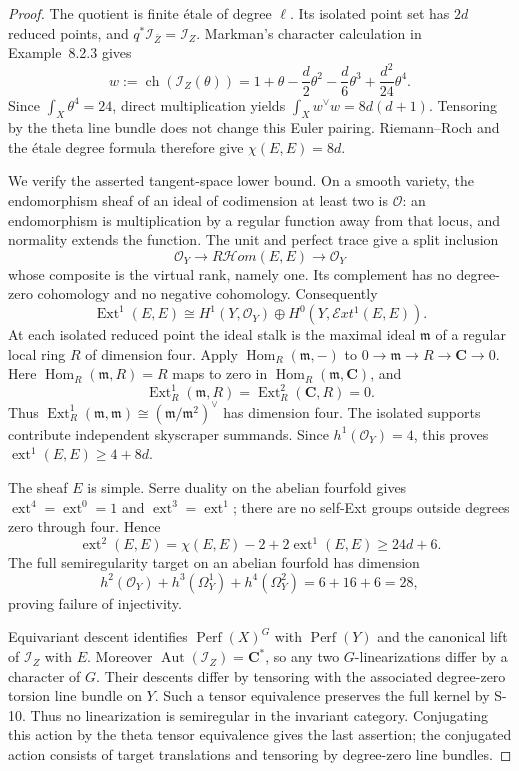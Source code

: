 \begin{proof}
The quotient is finite \'etale of degree $\ell$. Its isolated
point set has $2d$ reduced points, and
$q^*\mathcal I_{\bar Z}=\mathcal I_Z$.
Markman's character calculation in Example~8.2.3 gives
\[
 w:=\operatorname{ch}(\mathcal I_Z(\theta))
   =1+\theta-\frac d2\theta^2-\frac d6\theta^3
          +\frac{d^2}{24}\theta^4 .
\]
Since $\int_X\theta^4=24$, direct multiplication yields
$\int_X w^\vee w=8d(d+1)$. Tensoring by the theta line bundle
does not change this Euler pairing. Riemann--Roch and the
\'etale degree formula therefore give $\chi(E,E)=8d$.

We verify the asserted tangent-space lower bound. On a smooth
variety, the endomorphism sheaf of an ideal of codimension at
least two is $\mathcal O$: an endomorphism is multiplication
by a regular function away from that locus, and normality
extends the function. The unit and perfect trace give a split
inclusion
\[
 \mathcal O_Y\longrightarrow R\mathcal Hom(E,E)
       \longrightarrow\mathcal O_Y
\]
whose composite is the virtual rank, namely one. Its complement
has no degree-zero cohomology and no negative cohomology.
Consequently
\[
 \operatorname{Ext}^1(E,E)
 \cong H^1(Y,\mathcal O_Y)
       \oplus H^0(Y,\mathcal Ext^1(E,E)).
\]
At each isolated reduced point the ideal stalk is the maximal
ideal $\mathfrak m$ of a regular local ring $R$ of dimension
four. Apply $\operatorname{Hom}_R(\mathfrak m,-)$ to
$0\to\mathfrak m\to R\to\mathbf C\to0$.
Here $\operatorname{Hom}_R(\mathfrak m,R)=R$ maps to zero in
$\operatorname{Hom}_R(\mathfrak m,\mathbf C)$, and
\[
 \operatorname{Ext}^1_R(\mathfrak m,R)
   =\operatorname{Ext}^2_R(\mathbf C,R)=0.
\]
Thus
$\operatorname{Ext}^1_R(\mathfrak m,\mathfrak m)
\cong(\mathfrak m/\mathfrak m^2)^\vee$ has dimension four.
The isolated supports contribute independent skyscraper
summands. Since $h^1(\mathcal O_Y)=4$, this proves
$\operatorname{ext}^1(E,E)\ge4+8d$.

The sheaf $E$ is simple. Serre duality on the abelian fourfold
gives $\operatorname{ext}^4=\operatorname{ext}^0=1$ and
$\operatorname{ext}^3=\operatorname{ext}^1$; there are no
self-Ext groups outside degrees zero through four. Hence
\[
 \operatorname{ext}^2(E,E)
 =\chi(E,E)-2+2\operatorname{ext}^1(E,E)
 \ge24d+6.
\]
The full semiregularity target on an abelian fourfold has
dimension
\[
 h^2(\mathcal O_Y)+h^3(\Omega_Y^1)+h^4(\Omega_Y^2)
 =6+16+6=28,
\]
proving failure of injectivity.

Equivariant descent identifies
$\operatorname{Perf}(X)^G$ with $\operatorname{Perf}(Y)$
and the canonical lift of $\mathcal I_Z$ with $E$.
Moreover $\operatorname{Aut}(\mathcal I_Z)=\mathbf C^*$,
so any two $G$-linearizations differ by a character of $G$.
Their descents differ by tensoring with the associated
degree-zero torsion line bundle on $Y$. Such a tensor
equivalence preserves the full kernel by S-10.
Thus no linearization is semiregular in the invariant category.
Conjugating this action by the theta tensor equivalence gives
the last assertion; the conjugated action consists of target
translations and tensoring by degree-zero line bundles.
\end{proof}

